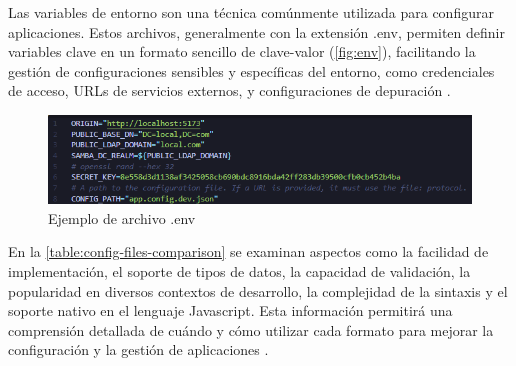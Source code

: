 Las variables de entorno son una técnica comúnmente utilizada para configurar aplicaciones. Estos archivos, generalmente con la extensión .env, permiten definir variables clave en un formato sencillo de clave-valor (\autoref{fig:env}), facilitando la gestión de configuraciones sensibles y específicas del entorno, como credenciales de acceso, URLs de servicios externos, y configuraciones de depuración \autocite{pandey_guide_2022}.

\begin{figure}[h]
    \centering
    \includegraphics{images/env.png}
    \caption{Ejemplo de archivo .env}
    \label{fig:env}
\end{figure}

En la \autoref{table:config-files-comparison} se examinan aspectos como la facilidad de implementación, el soporte de tipos de datos, la capacidad de validación, la popularidad en diversos contextos de desarrollo, la complejidad de la sintaxis y el soporte nativo en el lenguaje Javascript. Esta información permitirá una comprensión detallada de cuándo y cómo utilizar cada formato para mejorar la configuración y la gestión de aplicaciones \autocite{pandey_guide_2022,aws_yaml_2023,eriksson_comparison_2011}.

